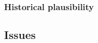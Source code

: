 \documentclass[12pt]{article}
\begin{document}


\subsubsection{Historical plausibility}




\subsection{Issues}


\end{document}

